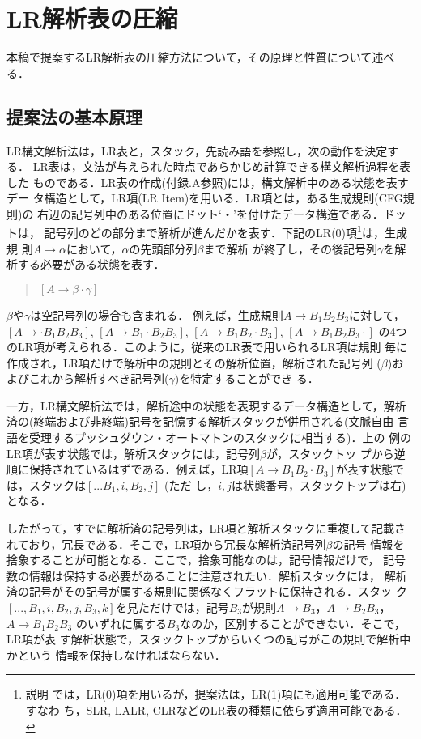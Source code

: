 \section{LR解析表の圧縮}
\label{ss:base}

本稿で提案するLR解析表の圧縮方法について，その原理と性質について述べる．

\subsection{提案法の基本原理}
\label{sec:basic}

LR構文解析法は，LR表と，スタック，先読み語を参照し，次の動作を決定する．
LR表は，文法が与えられた時点であらかじめ計算できる構文解析過程を表した
ものである．LR表の作成(付録.A参照)には，構文解析中のある状態を表すデー
タ構造として，LR項(LR Item)を用いる．LR項とは，ある生成規則(CFG規則)の
右辺の記号列中のある位置にドット`・'を付けたデータ構造である．ドットは，
記号列のどの部分まで解析が進んだかを表す．下記のLR(0)項\footnote{説明
  では，LR(0)項を用いるが，提案法は，LR(1)項にも適用可能である．すなわ
  ち，SLR, LALR, CLRなどのLR表の種類に依らず適用可能である．}は，生成規
則$A \rightarrow \alpha$において，$\alpha$の先頭部分列$\beta$まで解析
が終了し，その後記号列$\gamma$を解析する必要がある状態を表す．
\begin{quote}
  $[ A \rightarrow \beta \cdot \gamma ]$
\end{quote}
$\beta$や$\gamma$は空記号列の場合も含まれる．
例えば，生成規則$A \rightarrow B_1 B_2 B_3$に対して，
$[A \rightarrow \cdot B_1 B_2 B_3]$, 
$[A \rightarrow B_1 \cdot B_2 B_3]$,
$[A \rightarrow B_1 B_2 \cdot B_3]$,
$[A \rightarrow B_1 B_2 B_3 \cdot]$
の4つのLR項が考えられる．このように，従来のLR表で用いられるLR項は規則
毎に作成され，LR項だけで解析中の規則とその解析位置，解析された記号列
($\beta$)およびこれから解析すべき記号列($\gamma$)を特定することができ
る．

一方，LR構文解析法では，解析途中の状態を表現するデータ構造として，解析
済の(終端および非終端)記号を記憶する解析スタックが併用される(文脈自由
言語を受理するプッシュダウン・オートマトンのスタックに相当する)．上の
例のLR項が表す状態では，解析スタックには，記号列$\beta$が，スタックトッ
プから逆順に保持されているはずである．例えば，LR項$[A \rightarrow B_1
B_2 \cdot B_3]$が表す状態では，スタックは$[... B_1, i, B_2, j]$ (ただ
し，$i,j$は状態番号，スタックトップは右)となる．

したがって，すでに解析済の記号列は，LR項と解析スタックに重複して記載さ
れており，冗長である．そこで，LR項から冗長な解析済記号列$\beta$の記号
情報を捨象することが可能となる．ここで，捨象可能なのは，記号情報だけで，
記号数の情報は保持する必要があることに注意されたい．解析スタックには，
解析済の記号がその記号が属する規則に関係なくフラットに保持される．スタッ
ク$[..., B_1, i, B_2, j, B_3, k]$を見ただけでは，記号$B_3$が規則$A
\rightarrow B_3$，$A \rightarrow B_2 B_3$，$A \rightarrow B_1 B_2 B_3$
のいずれに属する$B_3$なのか，区別することができない．そこで，LR項が表
す解析状態で，スタックトップからいくつの記号がこの規則で解析中かという
情報を保持しなければならない．

